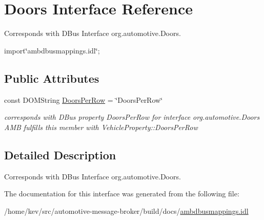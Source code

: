 \hypertarget{interfaceDoors}{\section{Doors Interface Reference}
\label{interfaceDoors}
}


Corresponds with D\+Bus Interface org.\+automotive.\+Doors.  




{\ttfamily import\char`\"{}ambdbusmappings.\+idl\char`\"{};}

\subsection*{Public Attributes}
\begin{DoxyCompactItemize}
\item 
\hypertarget{interfaceDoors_a934757a9ea6392a3e5937e2d46497f4c}{const D\+O\+M\+String \hyperlink{interfaceDoors_a934757a9ea6392a3e5937e2d46497f4c}{Doors\+Per\+Row} = \char`\"{}Doors\+Per\+Row\char`\"{}}\label{interfaceDoors_a934757a9ea6392a3e5937e2d46497f4c}

\begin{DoxyCompactList}\small\item\em corresponds with D\+Bus property Doors\+Per\+Row for interface org.\+automotive.\+Doors A\+M\+B fulfills this member with Vehicle\+Property\+::\+Doors\+Per\+Row \end{DoxyCompactList}\end{DoxyCompactItemize}


\subsection{Detailed Description}
Corresponds with D\+Bus Interface org.\+automotive.\+Doors. 

The documentation for this interface was generated from the following file\+:\begin{DoxyCompactItemize}
\item 
/home/kev/src/automotive-\/message-\/broker/build/docs/\hyperlink{ambdbusmappings_8idl}{ambdbusmappings.\+idl}\end{DoxyCompactItemize}
